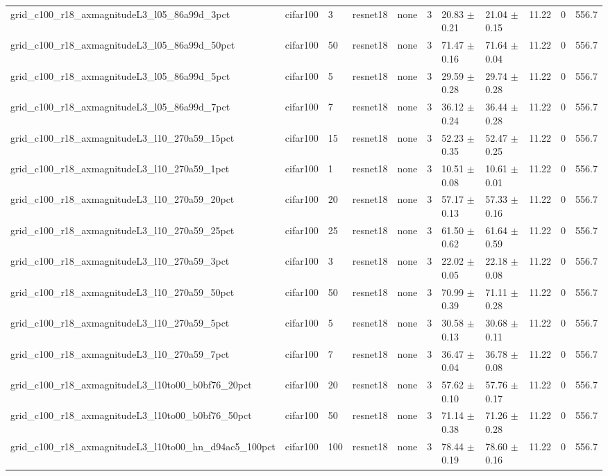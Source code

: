 \begin{tabular}{lllllllllll}
grid_c100_r18_axmagnitudeL3_l05_86a99d_3pct & cifar100 & 3 & resnet18 & none & 3 & 20.83 $\pm$ 0.21 & 21.04 $\pm$ 0.15 & 11.22 & 0 & 556.7 \\
grid_c100_r18_axmagnitudeL3_l05_86a99d_50pct & cifar100 & 50 & resnet18 & none & 3 & 71.47 $\pm$ 0.16 & 71.64 $\pm$ 0.04 & 11.22 & 0 & 556.7 \\
grid_c100_r18_axmagnitudeL3_l05_86a99d_5pct & cifar100 & 5 & resnet18 & none & 3 & 29.59 $\pm$ 0.28 & 29.74 $\pm$ 0.28 & 11.22 & 0 & 556.7 \\
grid_c100_r18_axmagnitudeL3_l05_86a99d_7pct & cifar100 & 7 & resnet18 & none & 3 & 36.12 $\pm$ 0.24 & 36.44 $\pm$ 0.28 & 11.22 & 0 & 556.7 \\
grid_c100_r18_axmagnitudeL3_l10_270a59_15pct & cifar100 & 15 & resnet18 & none & 3 & 52.23 $\pm$ 0.35 & 52.47 $\pm$ 0.25 & 11.22 & 0 & 556.7 \\
grid_c100_r18_axmagnitudeL3_l10_270a59_1pct & cifar100 & 1 & resnet18 & none & 3 & 10.51 $\pm$ 0.08 & 10.61 $\pm$ 0.01 & 11.22 & 0 & 556.7 \\
grid_c100_r18_axmagnitudeL3_l10_270a59_20pct & cifar100 & 20 & resnet18 & none & 3 & 57.17 $\pm$ 0.13 & 57.33 $\pm$ 0.16 & 11.22 & 0 & 556.7 \\
grid_c100_r18_axmagnitudeL3_l10_270a59_25pct & cifar100 & 25 & resnet18 & none & 3 & 61.50 $\pm$ 0.62 & 61.64 $\pm$ 0.59 & 11.22 & 0 & 556.7 \\
grid_c100_r18_axmagnitudeL3_l10_270a59_3pct & cifar100 & 3 & resnet18 & none & 3 & 22.02 $\pm$ 0.05 & 22.18 $\pm$ 0.08 & 11.22 & 0 & 556.7 \\
grid_c100_r18_axmagnitudeL3_l10_270a59_50pct & cifar100 & 50 & resnet18 & none & 3 & 70.99 $\pm$ 0.39 & 71.11 $\pm$ 0.28 & 11.22 & 0 & 556.7 \\
grid_c100_r18_axmagnitudeL3_l10_270a59_5pct & cifar100 & 5 & resnet18 & none & 3 & 30.58 $\pm$ 0.13 & 30.68 $\pm$ 0.11 & 11.22 & 0 & 556.7 \\
grid_c100_r18_axmagnitudeL3_l10_270a59_7pct & cifar100 & 7 & resnet18 & none & 3 & 36.47 $\pm$ 0.04 & 36.78 $\pm$ 0.08 & 11.22 & 0 & 556.7 \\
grid_c100_r18_axmagnitudeL3_l10to00_b0bf76_20pct & cifar100 & 20 & resnet18 & none & 3 & 57.62 $\pm$ 0.10 & 57.76 $\pm$ 0.17 & 11.22 & 0 & 556.7 \\
grid_c100_r18_axmagnitudeL3_l10to00_b0bf76_50pct & cifar100 & 50 & resnet18 & none & 3 & 71.14 $\pm$ 0.38 & 71.26 $\pm$ 0.28 & 11.22 & 0 & 556.7 \\
grid_c100_r18_axmagnitudeL3_l10to00_hn_d94ac5_100pct & cifar100 & 100 & resnet18 & none & 3 & 78.44 $\pm$ 0.19 & 78.60 $\pm$ 0.16 & 11.22 & 0 & 556.7 \\

\end{tabular}
